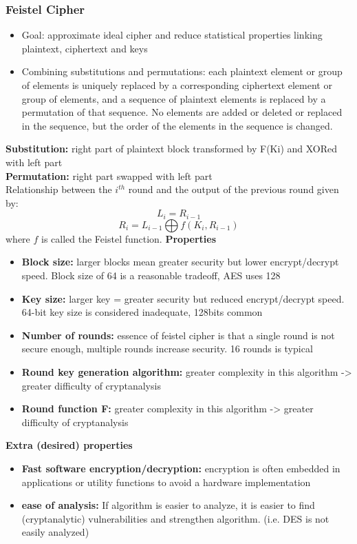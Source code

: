 \documentclass{article}
\begin{document}
\subsubsection{Feistel Cipher}
\begin{itemize}
    \item Goal: approximate ideal cipher and reduce statistical properties linking plaintext, ciphertext and keys
    \item Combining substitutions and permutations: each plaintext element or group of elements is uniquely replaced by a corresponding ciphertext element or group of elements, and a sequence of plaintext elements is replaced by a permutation of that sequence. No elements are added or deleted or replaced in the sequence, but the order of the elements in the sequence is changed.
\end{itemize}
\textbf{Substitution:} right part of plaintext block transformed by F(Ki) and XORed with left part
\\\textbf{Permutation:} right part swapped with left part
\\Relationship between the $i^{th}$ round and the output of the previous round given by:
$$L_i = R_{i-1}$$
$$R_i = L_{i-1}\bigoplus f(K_i, R_{i-1})$$
where $f$ is called the Feistel function.
\textbf{Properties}
\begin{itemize}
    \item \textbf{Block size:} larger blocks mean greater security but lower encrypt/decrypt speed. Block size of 64 is a reasonable tradeoff, AES uses 128
    \item \textbf{Key size:} larger key = greater security but reduced encrypt/decrypt speed. 64-bit key size is considered inadequate, 128bits common
    \item \textbf{Number of rounds:} essence of feistel cipher is that a single round is not secure enough, multiple rounds increase security. 16 rounds is typical
    \item \textbf{Round key generation algorithm:} greater complexity in this algorithm -> greater difficulty of cryptanalysis
    \item \textbf{Round function F:} greater complexity in this algorithm -> greater difficulty of cryptanalysis
\end{itemize}
\textbf{Extra (desired) properties}
\begin{itemize}
    \item \textbf{Fast software encryption/decryption:} encryption is often embedded in applications or utility functions to avoid a hardware implementation
    \item \textbf{ease of analysis:} If algorithm is easier to analyze, it is easier to find (cryptanalytic) vulnerabilities and strengthen algorithm. (i.e. DES is not easily analyzed)
\end{itemize}
\end{document}
